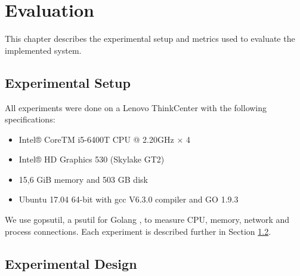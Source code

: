 \documentclass[USenglish]{uit-thesis}
\begin{document}





\chapter{Evaluation}
\glsresetall
This chapter describes the experimental setup and metrics used to evaluate the implemented system.

\section{Experimental Setup}
All experiments were done on a Lenovo ThinkCenter with the following specifications:

\begin{itemize} 
\item Intel® CoreTM i5-6400T CPU @ 2.20GHz × 4
\item Intel® HD Graphics 530 (Skylake GT2)
\item 15,6 GiB memory and 503 GB disk
\item Ubuntu 17.04 64-bit with gcc V6.3.0 compiler and GO 1.9.3
\end{itemize}


We use gopsutil, a psutil for Golang \cite{golangPsutil}, to measure CPU, memory, network and process connections. Each experiment is described further in Section \ref{eva:exp_des}.

\section{Experimental Design} \label{eva:exp_des}
\end{document}
